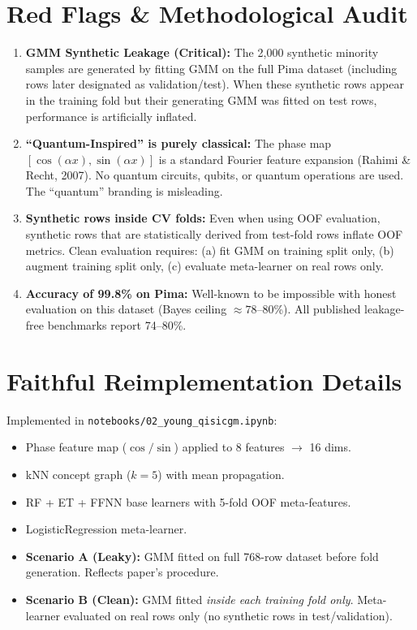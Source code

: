 \documentclass[12pt,a4paper]{article}
\begin{document}
\section{Red Flags \& Methodological Audit}
\begin{enumerate}[leftmargin=*]
  \item \textbf{GMM Synthetic Leakage (Critical):} The 2,000 synthetic minority samples are generated by fitting GMM on the full Pima dataset (including rows later designated as validation/test). When these synthetic rows appear in the training fold but their generating GMM was fitted on test rows, performance is artificially inflated.
  \item \textbf{``Quantum-Inspired'' is purely classical:} The phase map $[\cos(\alpha x), \sin(\alpha x)]$ is a standard Fourier feature expansion (Rahimi \& Recht, 2007). No quantum circuits, qubits, or quantum operations are used. The ``quantum'' branding is misleading.
  \item \textbf{Synthetic rows inside CV folds:} Even when using OOF evaluation, synthetic rows that are statistically derived from test-fold rows inflate OOF metrics. Clean evaluation requires: (a) fit GMM on training split only, (b) augment training split only, (c) evaluate meta-learner on real rows only.
  \item \textbf{Accuracy of 99.8\% on Pima:} Well-known to be impossible with honest evaluation on this dataset (Bayes ceiling $\approx 78$--80\%). All published leakage-free benchmarks report 74--80\%.
\end{enumerate}

\section{Faithful Reimplementation Details}
Implemented in \texttt{notebooks/02\_young\_qisicgm.ipynb}:
\begin{itemize}[leftmargin=*]
  \item Phase feature map ($\cos/\sin$) applied to 8 features $\to$ 16 dims.
  \item kNN concept graph ($k=5$) with mean propagation.
  \item RF + ET + FFNN base learners with 5-fold OOF meta-features.
  \item LogisticRegression meta-learner.
  \item \textbf{Scenario A (Leaky):} GMM fitted on full 768-row dataset before fold generation. Reflects paper's procedure.
  \item \textbf{Scenario B (Clean):} GMM fitted \emph{inside each training fold only}. Meta-learner evaluated on real rows only (no synthetic rows in test/validation).
\end{itemize}
\end{document}
